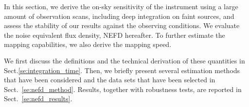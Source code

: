 
%

In this section, we derive the on-sky sensitivity of the instrument
using a large amount of observation scans, including deep integration
on faint sources, and assess the stability of our results against the
observing conditions. We evaluate the noise equivalent flux density,
NEFD hereafter. To further estimate the mapping capabilities, we also
derive the mapping speed.

We first discuss the definitions and the technical derivation
of these quantities in Sect.\ref{se:integration_time}.
Then, we briefly present several estimation methods that have been
considered and the data sets that have been selected in
Sect.~\ref{se:nefd_method}.
Results, together with robustness tests, are reported in Sect.~\ref{se:nefd_results}.


